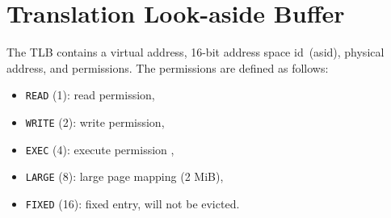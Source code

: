 \section{Translation Look-aside Buffer}
\label{sec:tlb}

The TLB contains a virtual address, 16-bit address space id~(asid), physical address, and
permissions. The permissions are defined as follows:

\begin{itemize}
  \item \texttt{READ} (1): read permission,
  \item \texttt{WRITE} (2): write permission,
  \item \texttt{EXEC} (4): execute permission ,
  \item \texttt{LARGE} (8): large page mapping (2 MiB),
  \item \texttt{FIXED} (16): fixed entry, will not be evicted.
\end{itemize}
\cbend
